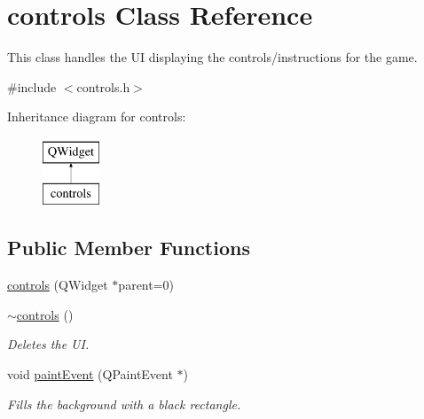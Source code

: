 \hypertarget{classcontrols}{}\section{controls Class Reference}
\label{classcontrols}


This class handles the UI displaying the controls/instructions for the game.  




{\ttfamily \#include $<$controls.\+h$>$}

Inheritance diagram for controls\+:\begin{figure}[H]
\begin{center}
\leavevmode
\includegraphics[height=2.000000cm]{classcontrols}
\end{center}
\end{figure}
\subsection*{Public Member Functions}
\begin{DoxyCompactItemize}
\item 
\hyperlink{classcontrols_a9a2803968e87a1d002044fbafcbad766}{controls} (Q\+Widget $\ast$parent=0)
\item 
\hyperlink{classcontrols_a69af1fa496cee3411b8d2f207f046786}{$\sim$controls} ()\hypertarget{classcontrols_a69af1fa496cee3411b8d2f207f046786}{}\label{classcontrols_a69af1fa496cee3411b8d2f207f046786}

\begin{DoxyCompactList}\small\item\em Deletes the UI. \end{DoxyCompactList}\item 
void \hyperlink{classcontrols_a61cf1ab9310885ff551b2393be8bab66}{paint\+Event} (Q\+Paint\+Event $\ast$)\hypertarget{classcontrols_a61cf1ab9310885ff551b2393be8bab66}{}\label{classcontrols_a61cf1ab9310885ff551b2393be8bab66}

\begin{DoxyCompactList}\small\item\em Fills the background with a black rectangle. \end{DoxyCompactList}\end{DoxyCompactItemize}


